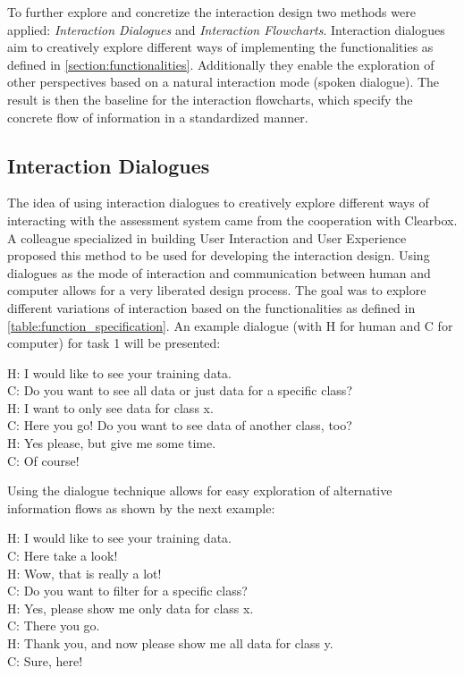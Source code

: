 \documentclass[11pt,a4paper,english]{scrreprt}
\begin{document}
To further explore and concretize the interaction design two methods were applied: \textit{Interaction Dialogues} and \textit{Interaction Flowcharts}. Interaction dialogues aim to creatively explore different ways of implementing the functionalities as defined in \autoref{section:functionalities}. Additionally they enable the exploration of other perspectives based on a natural interaction mode (spoken dialogue). The result is then the baseline for the interaction flowcharts, which specify the concrete flow of information in a standardized manner.

\subsection{Interaction Dialogues}
The idea of using interaction dialogues to creatively explore different ways of interacting with the assessment system came from the cooperation with Clearbox. A colleague specialized in building User Interaction and User Experience proposed this method to be used for developing the interaction design. Using dialogues as the mode of interaction and communication between human and computer allows for a very liberated design process. The goal was to explore different variations of interaction based on the functionalities as defined in \autoref{table:function_specification}. An example dialogue (with H for human and C for computer) for task 1 will be presented:
\begin{displayquote}
    H: I would like to see your training data.\\
    C: Do you want to see all data or just data for a specific class?\\
    H: I want to only see data for class x.\\
    C: Here you go! Do you want to see data of another class, too?\\
    H: Yes please, but give me some time.\\
    C: Of course!
\end{displayquote}

Using the dialogue technique allows for easy exploration of alternative information flows as shown by the next example:
\begin{displayquote}
    H: I would like to see your training data.\\
    C: Here take a look!\\
    H: Wow, that is really a lot!\\
    C: Do you want to filter for a specific class?\\
    H: Yes, please show me only data for class x.\\
    C: There you go.\\
    H: Thank you, and now please show me all data for class y.\\
    C: Sure, here!
\end{displayquote}
\end{document}
